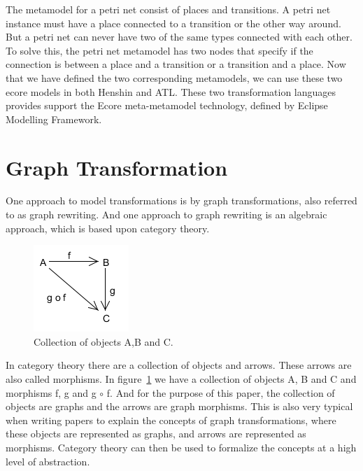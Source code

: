 \documentclass[pdftex,11pt,a4paper]{article}
\begin{document}
The metamodel for a petri net consist of places and transitions. A petri net
instance must have a place connected to a transition or the other way around.
But a petri net can never have two of the same types connected with each other.
To solve this, the petri net metamodel has two nodes that specify if the
connection is between a place and a transition or a transition and a place.
\indent Now that we have defined the two corresponding metamodels, we can use
these two ecore models in both Henshin and ATL. These two transformation
languages provides support the Ecore meta-metamodel technology, defined by
Eclipse Modelling Framework. 

\subsection{}

\section{Graph Transformation}
\noindent One approach to model transformations is by graph transformations,
also referred to as graph rewriting. And one approach to graph rewriting is an
algebraic approach, which is based upon category theory\cite{Barr1990}.

\begin{figure}[H]
	\centering
	\includegraphics[scale=0.7]{figures/categoryTheory.png}
	\caption{Collection of objects A,B and C.}
	\label{fig:categoryTheory}
\end{figure}


In category theory there are a collection of objects and arrows. These arrows
are also called morphisms. In figure~\ref{fig:categoryTheory} we have a
collection of objects A, B and C and morphisms f, g and g $\circ$ f. And for the
purpose of this paper, the collection of objects are graphs and the arrows are
graph morphisms. This is also very typical when writing papers to explain the
concepts of graph transformations, where these objects are represented as
graphs, and arrows are represented as morphisms. Category theory can then be
used to formalize the concepts at a high level of abstraction.
\end{document}
